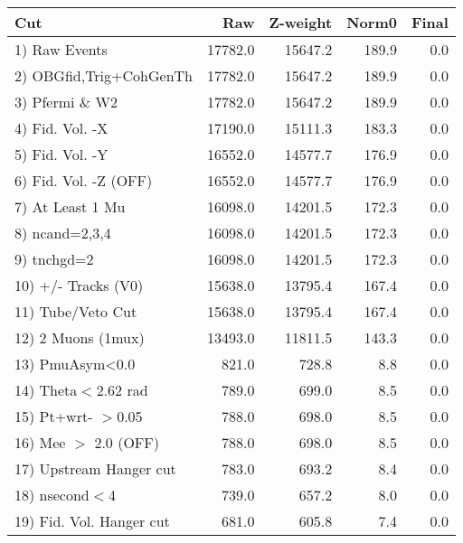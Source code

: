  \begin{table}[h!]\centering
 \begin{tabular}{||l||r|r|r|r||}
 \hline
 \hline
 Cut & Raw & Z-weight & Norm0 & Final \\
 \hline
  1) Raw Events           &     17782.0 &     15647.2 &       189.9 &         0.0 \\
  2) OBGfid,Trig+CohGenTh &     17782.0 &     15647.2 &       189.9 &         0.0 \\
  3) Pfermi \& W2         &     17782.0 &     15647.2 &       189.9 &         0.0 \\
  4) Fid. Vol. -X         &     17190.0 &     15111.3 &       183.3 &         0.0 \\
  5) Fid. Vol. -Y         &     16552.0 &     14577.7 &       176.9 &         0.0 \\
  6) Fid. Vol. -Z (OFF)   &     16552.0 &     14577.7 &       176.9 &         0.0 \\
  7) At Least 1 Mu        &     16098.0 &     14201.5 &       172.3 &         0.0 \\
  8) ncand=2,3,4          &     16098.0 &     14201.5 &       172.3 &         0.0 \\
  9) tnchgd=2             &     16098.0 &     14201.5 &       172.3 &         0.0 \\
 10) +/- Tracks (V0)      &     15638.0 &     13795.4 &       167.4 &         0.0 \\
 11) Tube/Veto Cut        &     15638.0 &     13795.4 &       167.4 &         0.0 \\
 12) 2 Muons (1mux)       &     13493.0 &     11811.5 &       143.3 &         0.0 \\
 13) PmuAsym<0.0          &       821.0 &       728.8 &         8.8 &         0.0 \\
 14) Theta$<$2.62 rad     &       789.0 &       699.0 &         8.5 &         0.0 \\
 15) Pt+wrt- $>$0.05      &       788.0 &       698.0 &         8.5 &         0.0 \\
 16) Mee $>$ 2.0  (OFF)   &       788.0 &       698.0 &         8.5 &         0.0 \\
 17) Upstream Hanger cut  &       783.0 &       693.2 &         8.4 &         0.0 \\
 18) nsecond$<$4          &       739.0 &       657.2 &         8.0 &         0.0 \\
 19) Fid. Vol. Hanger cut &       681.0 &       605.8 &         7.4 &         0.0 \\

\end{tabular}
\end{table}
